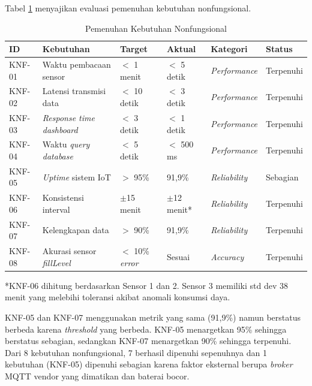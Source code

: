 Tabel \ref{tab:pemenuhan-knf-hasil} menyajikan evaluasi pemenuhan kebutuhan nonfungsional.

\begin{table}[H]
  \caption{Pemenuhan Kebutuhan Nonfungsional}
  \label{tab:pemenuhan-knf-hasil}
  \begin{tabularx}{\textwidth}{| l | X | l | l | l | l |}
    \hline
    \textbf{ID} & \textbf{Kebutuhan} & \textbf{Target} & \textbf{Aktual} & \textbf{Kategori} & \textbf{Status} \\
    \hline
    KNF-01 & Waktu pembacaan sensor       & $<$ 1 menit & $<$ 5 detik & \textit{Performance} & Terpenuhi \\
    \hline
    KNF-02 & Latensi transmisi data       & $<$ 10 detik & $<$ 3 detik & \textit{Performance} & Terpenuhi \\
    \hline
    KNF-03 & \textit{Response time dashboard} & $<$ 3 detik & $<$ 1 detik & \textit{Performance} & Terpenuhi \\
    \hline
    KNF-04 & Waktu \textit{query database} & $<$ 5 detik & $<$ 500 ms & \textit{Performance} & Terpenuhi \\
    \hline
    KNF-05 & \textit{Uptime} sistem IoT   & $>$ 95\% & 91,9\% & \textit{Reliability} & Sebagian \\
    \hline
    KNF-06 & Konsistensi interval         & $\pm$15 menit & $\pm$12 menit* & \textit{Reliability} & Terpenuhi \\
    \hline
    KNF-07 & Kelengkapan data             & $>$ 90\% & 91,9\% & \textit{Reliability} & Terpenuhi \\
    \hline
    KNF-08 & Akurasi sensor \textit{fillLevel} & $<$ 10\% \textit{error} & Sesuai & \textit{Accuracy} & Terpenuhi \\
    \hline
  \end{tabularx}
\end{table}

*KNF-06 dihitung berdasarkan Sensor 1 dan 2. Sensor 3 memiliki std dev 38 menit yang melebihi toleransi akibat anomali konsumsi daya.

KNF-05 dan KNF-07 menggunakan metrik yang sama (91,9\%) namun berstatus berbeda karena \textit{threshold} yang berbeda. KNF-05 menargetkan 95\% sehingga berstatus sebagian, sedangkan KNF-07 menargetkan 90\% sehingga terpenuhi. Dari 8 kebutuhan nonfungsional, 7 berhasil dipenuhi sepenuhnya dan 1 kebutuhan (KNF-05) dipenuhi sebagian karena faktor eksternal berupa \textit{broker} MQTT vendor yang dimatikan dan baterai bocor.

